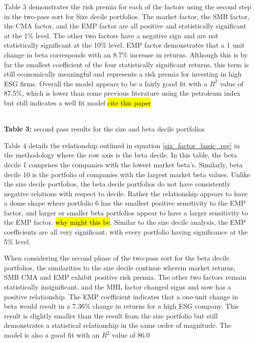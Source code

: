 Table 3 demonstrates the risk premia for each of the factors using the second step in the two-pass sort for Size decile portfolios. The market factor, the SMB factor, the CMA factor, and the EMP factor are all positive and statistically significant at the 1\% level. The other two factors have a negative sign and are not statistically significant at the 10\% level.  EMP factor demonstrates that a 1 unit change in beta corresponds with an 8.7\% increase in returns. Although this is by far the smallest coefficient of the four statistically significant returns, this term is still economically meaningful and represents a risk premia for investing in high ESG firms. Overall the model appears to be a fairly good fit with a $R^2$ value of 87.5\%, which is lower than some previous literature using the petroleum index but still indicates a well fit model \hl{cite this paper} 


\begin{center}
    \paperspacingnarrow
    \\
    \textbf{Table 3:} second pass results for the size and beta decile portfolios\\
    \paperspacingwide
\end{center}

Table 4 details the relationship outlined in equation \eqref{six_factor_basic_reg} in the methodology where the row axis is the beta decile. In this table,  the beta decile 1 comprises the companies with the lowest market beta's. Similarly, beta decile 10 is the portfolio of companies with the largest market beta values.  Unlike the size decile portfolios, the beta decile portfolios do not have consistently negative relations with respect to decile. Rather the relationship appears to have a dome shape where portfolio 6 has the smallest positive sensitivity to the EMP factor, and larger or smaller beta portfolios appear to have a larger sensitivity to the  EMP factor. \hl{why might this be}. Similar to the size decile analysis, the EMP coefficients are all very significant, with every portfolio having significance at the 5\% level. 

When considering the second phase of the two-pass sort for the beta decile portfolios, the similarities to the size decile continue wherein market returns, SMB CMA and EMP exhibit positive risk premia. The other two factors remain statistically insignificant, and the MHL factor changed signs and now has a positive relationship. The EMP coefficient indicates that a one-unit change in beta would result in a 7.36\% change in returns for a high ESG company. This result is slightly smaller than the result from the size portfolio but still demonstrates a statistical relationship in the same order of magnitude. The model is also a good fit with an $R^2$ value of 86.0%

